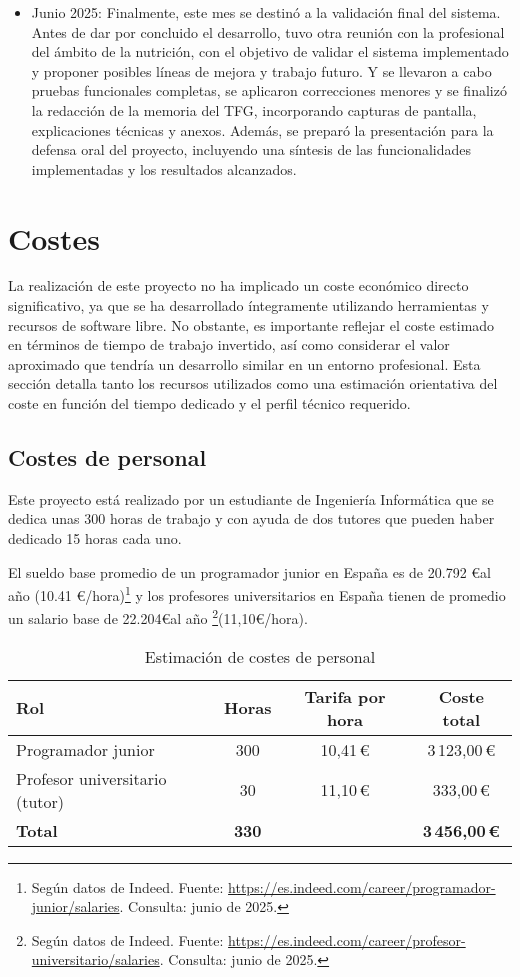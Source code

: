 \begin{itemize}
    \item Junio 2025: Finalmente, este mes se destinó a la validación final del sistema. Antes de dar por concluido el desarrollo, tuvo otra reunión con la profesional del ámbito de la nutrición, con el objetivo de validar el sistema implementado y proponer posibles líneas de mejora y trabajo futuro. Y se llevaron a cabo pruebas funcionales completas, se aplicaron correcciones menores y se finalizó la redacción de la memoria del TFG, incorporando capturas de pantalla, explicaciones técnicas y anexos. Además, se preparó la presentación para la defensa oral del proyecto, incluyendo una síntesis de las funcionalidades implementadas y los resultados alcanzados.
\end{itemize}

\section{Costes}
La realización de este proyecto no ha implicado un coste económico directo significativo, ya que se ha desarrollado íntegramente utilizando herramientas y recursos de software libre. No obstante, es importante reflejar el coste estimado en términos de tiempo de trabajo invertido, así como considerar el valor aproximado que tendría un desarrollo similar en un entorno profesional. Esta sección detalla tanto los recursos utilizados como una estimación orientativa del coste en función del tiempo dedicado y el perfil técnico requerido.

\subsection{Costes de personal}
Este proyecto está realizado por un estudiante de Ingeniería Informática que se dedica unas 300 horas de trabajo y con ayuda de dos tutores que pueden haber dedicado 15 horas cada uno. 

El sueldo base promedio de un programador junior en España es de 20.792 \euro al año (10.41 \euro/hora)\footnote{Según datos de Indeed. Fuente: \url{https://es.indeed.com/career/programador-junior/salaries}. Consulta: junio de 2025.} y los profesores universitarios en España tienen de promedio un salario base de 22.204\euro al año \footnote{Según datos de Indeed. Fuente: \url{https://es.indeed.com/career/profesor-universitario/salaries}. Consulta: junio de 2025.}(11,10\euro/hora).

\begin{table}[H]
\centering
\begin{tabular}{|p{3.5cm}|c|c|c|}
\hline
\textbf{Rol} & \textbf{Horas} & \textbf{Tarifa por hora} & \textbf{Coste total} \\
\hline
Programador junior & 300 & 10,41\,\euro{} & 3\,123,00\,\euro{} \\
\hline
Profesor universitario (tutor) & 30 & 11,10\,\euro{} & 333,00\,\euro{} \\
\hline
\textbf{Total} & \textbf{330} & & \textbf{3\,456,00\,\euro{}} \\
\hline
\end{tabular}
\caption{Estimación de costes de personal}
\label{tab:coste_personal_proyecto}
\end{table}


